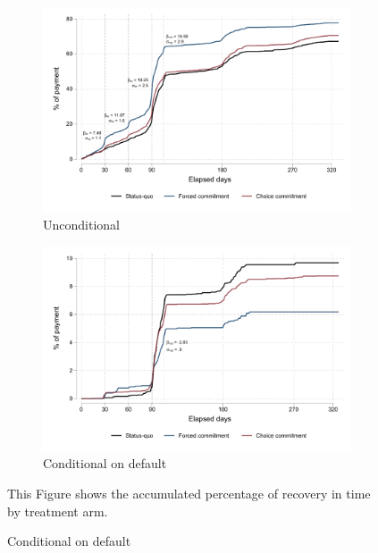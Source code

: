 \begin{figure}[H]
        \caption{\% of payment over time}
        \vspace{-2em}
    \label{porc_payment_over_time}
    \begin{center}
   \begin{subfigure}{0.49\textwidth}
        \caption{Unconditional}
        \centering
        \includegraphics[width=\textwidth]{Figuras/cumulative_porc_pay_time.pdf}
    \end{subfigure} 
   \begin{subfigure}{0.49\textwidth}
        \caption{Conditional on default}
        \centering
        \includegraphics[width=\textwidth]{Figuras/cumulative_porc_pay_time_default.pdf}
    \end{subfigure}     
    \end{center}
     \scriptsize  This Figure shows the accumulated percentage of recovery in time by treatment arm. 
\end{figure}




